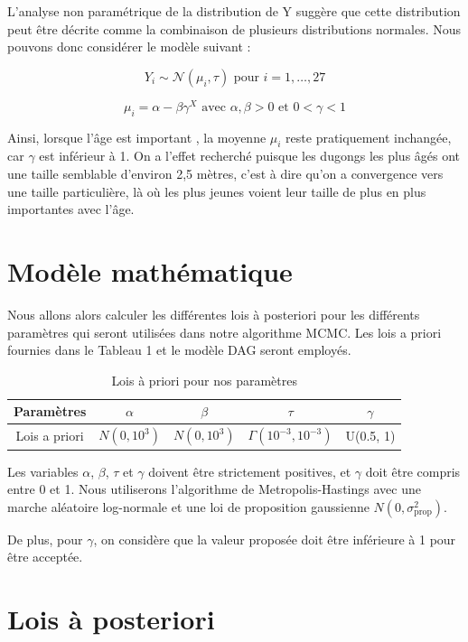 \documentclass{rapportECN}
\begin{document}
L'analyse non paramétrique de la distribution de Y suggère que cette distribution peut être décrite comme la combinaison de plusieurs distributions normales. Nous pouvons donc considérer le modèle suivant :

\[ Y_i \sim \mathcal{N}(\mu_i, \tau) \text{ pour } i = 1, \dots, 27 \]

\[ \mu_i = \alpha - \beta \gamma^X \text{ avec } \alpha, \beta > 0 \text{ et } 0 < \gamma < 1 \]

Ainsi, lorsque l'âge est important , la moyenne $\mu_i$ reste pratiquement inchangée, car $\gamma$ est inférieur à 1. On a l'effet recherché puisque les dugongs les  plus âgés ont une taille semblable d'environ 2,5 mètres, c'est à dire qu'on a convergence vers une taille particulière, là où les plus jeunes voient leur taille de plus en plus importantes avec l'âge.

\section*{Modèle mathématique}

Nous allons alors calculer les différentes lois à posteriori pour les différents paramètres qui seront utilisées dans notre algorithme MCMC. Les lois a priori fournies dans le Tableau 1 et le modèle DAG seront employés.

\begin{table}[H]
\centering
\begin{tabular}{|c|c|c|c|c|}
\hline
Paramètres & $\alpha$ & $\beta$ & $\tau$ & $\gamma$ \\
\hline
Lois a priori & $N(0, 10^3)$ & $N(0, 10^3)$ & $\Gamma(10^{-3}, 10^{-3})$ & U(0.5, 1) \\
\hline
\end{tabular}
\caption{Lois à priori pour nos paramètres}
\end{table}

Les variables $\alpha$, $\beta$, $\tau$ et $\gamma$ doivent être strictement positives, et $\gamma$ doit être compris entre 0 et 1. Nous utiliserons l'algorithme de Metropolis-Hastings avec une marche aléatoire log-normale et une loi de proposition gaussienne $N(0, \sigma_{\text{prop}}^2)$.

De plus, pour $\gamma$, on considère que la valeur proposée doit être inférieure à 1 pour être acceptée.

\section*{Lois à posteriori}
\end{document}
